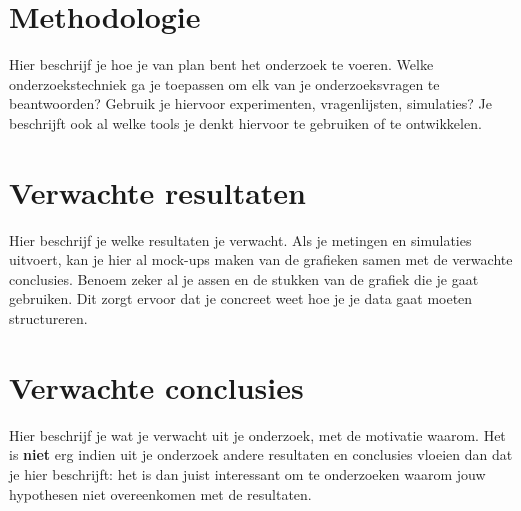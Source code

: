 \documentclass[fleqn,10pt]{voorstel}
\begin{document}



\section{Methodologie}
\label{sec:methodologie}

Hier beschrijf je hoe je van plan bent het onderzoek te voeren. Welke onderzoekstechniek ga je toepassen om elk van je onderzoeksvragen te beantwoorden? Gebruik je hiervoor experimenten, vragenlijsten, simulaties? Je beschrijft ook al welke tools je denkt hiervoor te gebruiken of te ontwikkelen.

\section{Verwachte resultaten}
\label{sec:verwachte_resultaten}

Hier beschrijf je welke resultaten je verwacht. Als je metingen en simulaties uitvoert, kan je hier al mock-ups maken van de grafieken samen met de verwachte conclusies. Benoem zeker al je assen en de stukken van de grafiek die je gaat gebruiken. Dit zorgt ervoor dat je concreet weet hoe je je data gaat moeten structureren.

\section{Verwachte conclusies}
\label{sec:verwachte_conclusies}

Hier beschrijf je wat je verwacht uit je onderzoek, met de motivatie waarom. Het is \textbf{niet} erg indien uit je onderzoek andere resultaten en conclusies vloeien dan dat je hier beschrijft: het is dan juist interessant om te onderzoeken waarom jouw hypothesen niet overeenkomen met de resultaten.


\printbibliography[heading=bibintoc]
\end{document}
